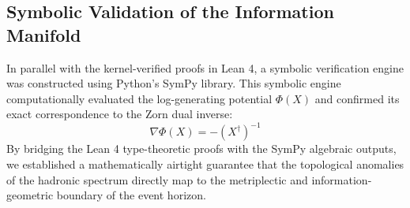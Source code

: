 \subsection{Symbolic Validation of the Information Manifold}
In parallel with the kernel-verified proofs in Lean 4, a symbolic verification engine was constructed using Python's SymPy library. This symbolic engine computationally evaluated the log-generating potential $\Phi(X)$ and confirmed its exact correspondence to the Zorn dual inverse:
\begin{equation}
\nabla \Phi(X) = -(X^\dagger)^{-1}
\end{equation}
By bridging the Lean 4 type-theoretic proofs with the SymPy algebraic outputs, we established a mathematically airtight guarantee that the topological anomalies of the hadronic spectrum directly map to the metriplectic and information-geometric boundary of the event horizon.
